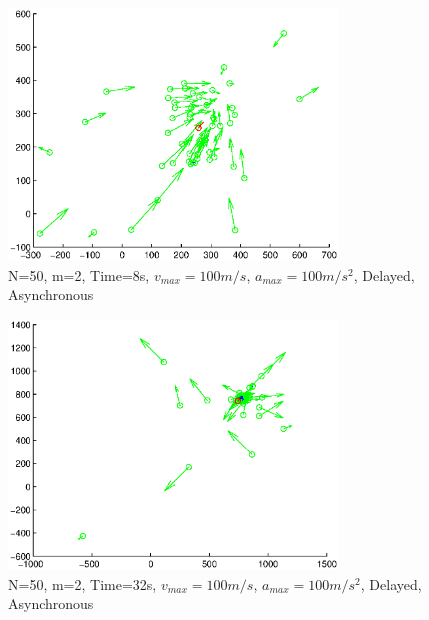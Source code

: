\documentclass[10pt, conference]{IEEEtran}
\begin{document}
\begin{figure}[!p]
  \begin{center}
    \includegraphics[width=3.45in]{n50m2vmax100amax10000t08delayAsync}
  \end{center}

  \caption{\small N=50, m=2, Time=8s, $v_{max}=100m/s$, $a_{max}=100m/s^2$, Delayed, Asynchronous}
  \label{fig:n50m2vmax100amax10000t08delayAsync}
\end{figure}

\begin{figure}[!p]
  \begin{center}
    \includegraphics[width=3.45in]{n50m2vmax100amax10000t32delayAsync}
  \end{center}

  \caption{\small N=50, m=2, Time=32s, $v_{max}=100m/s$, $a_{max}=100m/s^2$, Delayed, Asynchronous}
  \label{fig:n50m2vmax100amax10000t32delayAsync}
\end{figure}

\clearpage
\end{document}
